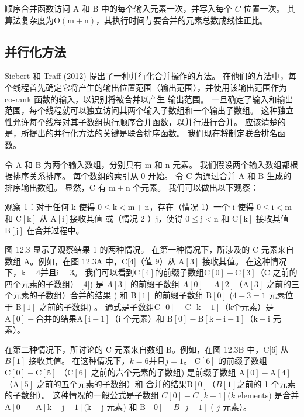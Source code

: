 顺序合并函数访问 $\mathrm{A}$ 和 $\mathrm{B}$ 中的每个输入元素一次，并写入每个 $C$ 位置一次。 其算法复杂度为$\mathrm{O}(\mathrm{m}+\mathrm{n})$，其执行时间与要合并的元素总数成线性正比。

\subsection{并行化方法}
Siebert 和 Traff (2012) 提出了一种并行化合并操作的方法。 在他们的方法中，每个线程首先确定它将产生的输出位置范围（输出范围），并使用该输出范围作为 co-rank 函数的输入，以识别将被合并以产生 输出范围。 一旦确定了输入和输出范围，每个线程就可以独立访问其两个输入子数组和一个输出子数组。 这种独立性允许每个线程对其子数组执行顺序合并函数，以并行进行合并。 应该清楚的是，所提出的并行化方法的关键是联合排序函数。 我们现在将制定联合排名函数。

令 $\mathrm{A}$ 和 $\mathrm{B}$ 为两个输入数组，分别具有 $\mathrm{m}$ 和 $\mathrm{n}$ 元素。 我们假设两个输入数组都根据排序关系排序。 每个数组的索引从 0 开始。 令 $\mathrm{C}$ 为通过合并 $\mathrm{A}$ 和 $\mathrm{B}$ 生成的排序输出数组。 显然，$\mathrm{C}$ 有 $\mathrm{m}+\mathrm{n}$ 个元素。 我们可以做出以下观察：

观察 1：对于任何 $\mathrm{k}$ 使得 $0 \leq \mathrm{k}<\mathrm{m}+\mathrm{n}$，存在（情况 1）一个 $\mathrm{i} $ 使得 $0 \leq \mathrm{i}<\mathrm{m}$ 和 $\mathrm{C}[\mathrm{k}]$ 从 $\mathrm{A}[\mathrm{i}] 接收其值 $ 或（情况 2 ）$\mathrm{j}$，使得 $0 \leq \mathrm{j}<\mathrm{n}$ 和 $\mathrm{C}[\mathrm{k}]$ 接收其值 $\mathrm{B}[\mathrm{j}]$ 在合并过程中。

图 12.3 显示了观察结果 1 的两种情况。 在第一种情况下，所涉及的 $\mathrm{C}$ 元素来自数组 A。例如，在图 12.3A 中，C[4]（值 9）从 $\mathrm{A}[3]$ 接收其值。 在这种情况下，$\mathrm{k}=4$并且$\mathrm{i}=3$。 我们可以看到$\mathrm{C}[4]$的前缀子数组$\mathrm{C}[0]-\mathrm{C}[3]$（$\mathrm{C}$ 之前的四个元素的子数组） [4]) 是 $A[3]$ 的前缀子数组 $A[0]-A[2]$（$\mathrm{A}[3]$ 之前的三个元素的子数组）合并的结果 ) 和 $\mathrm{B}[1]$ 的前缀子数组 $\mathrm{B}[0]$ ($4-3=1$ 元素位于 $\mathrm{B}[1]$ 之前的子数组) 。 通式是子数组$\mathrm{C}[0]-\mathrm{C}[\mathrm{k}-1]$（k个元素）是$\mathrm{A}[0]-合并的结果 \mathrm{A}[\mathrm{i}-1]$（i 个元素）和 $\mathrm{B}[0]-\mathrm{B}[\mathrm{k}-\mathrm{i}-1] （\mathrm{k}-\mathrm{i}$ 元素）。

在第二种情况下，所讨论的 $\mathrm{C}$ 元素来自数组 B。例如，在图 12.3B 中，C[6] 从 $B[1]$ 接收其值。 在这种情况下，$k=6$并且$j=1$。 $\mathrm{C}[6]$ 的前缀子数组 $\mathrm{C}[0]-\mathrm{C}[5]$ （$\mathrm{C}[6]$ 之前的六个元素的子数组) 是前缀子数组 $\mathrm{A}[0]-\mathrm{A}[4]$ （$\mathrm{A}[5]$ 之前的五个元素的子数组）和 合并的结果$\mathrm{B}[0]$（$B[1]$之前的 1 个元素的子数组）。 这种情况的一般公式是子数组 $C[0]-C[k-1](k$ elements) 是合并 $\mathrm{A}[0]-\mathrm{A}[\mathrm{ k}-\mathrm{j}-1](\mathrm{k}-\mathrm{j}$ 元素) 和 $\mathrm{B}$ $[0]-B[j-1]$ ( $j$ 元素）。

